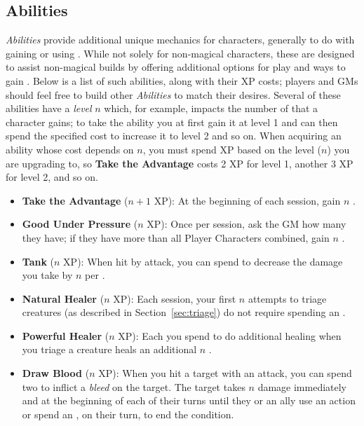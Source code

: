 \subsection{Abilities}
\emph{Abilities} provide additional unique mechanics for characters, generally to do with gaining or using \Advantage.
While not solely for non-magical characters, these \Ability{} are designed to assist non-magical builds by offering additional options for play and ways to gain \Advantage{}.
Below is a list of such abilities, along with their XP costs; players and GMs should feel free to build other \emph{Abilities} to match their desires.
Several of these abilities have a \emph{level} $n$ which, for example, impacts the number of \Advantage{} that a character gains; to take the ability you at first gain it at level 1 and can then spend the specified cost to increase it to level 2 and so on.
When acquiring an ability whose cost depends on $n$, you must spend XP based on the level ($n$) you are upgrading to, so \textbf{Take the Advantage} costs 2 XP for level 1, another 3 XP for level 2, and so on.
\begin{itemize}
  \item \textbf{Take the Advantage} ($n + 1$ XP): At the beginning of each session, gain $n$ \Advantage.
  \item \textbf{Good Under Pressure} ($n$ XP): Once per session, ask the GM how many \Advantage{} they have; if they have more than all Player Characters combined, gain $n$ \Advantage.
  \item \textbf{Tank} ($n$ XP): When hit by attack, you can spend \Advantage{} to decrease the damage you take by $n$ per \Advantage{}.
  \item \textbf{Natural Healer} ($n$ XP): Each session, your first $n$ attempts to triage creatures (as described in Section~\ref{sec:triage}) do not require spending an \Advantage.
  \item \textbf{Powerful Healer} ($n$ XP): Each \Advantage you spend to do additional healing when you triage a creature heals an additional $n$ \Life.
  \item \textbf{Draw Blood} ($n$ XP): When you hit a target with an attack, you can spend two \Advantage{} to inflict a \emph{bleed} on the target. The target takes $n$ damage immediately and at the beginning of each of their turns until they or an ally use an action or spend an \Advantage{}, on their turn, to end the condition.
\end{itemize}

